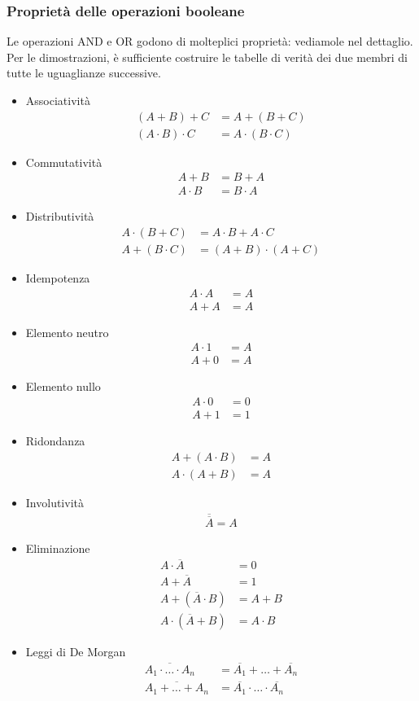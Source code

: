 \documentclass[a4paper, 11pt]{article}
\renewcommand{\sf}{\textsf}
\begin{document}
\subsubsection{Proprietà delle operazioni booleane}
Le operazioni \sf{AND} e \sf{OR} godono di molteplici proprietà: vediamole nel dettaglio. Per le dimostrazioni, è sufficiente costruire le tabelle di verità dei due membri di tutte le uguaglianze successive.
\begin{itemize}
	\item Associatività
	\begin{align*}
		(A+B)+C&=A+(B+C)\\
		(A\cdot B)\cdot C&=A\cdot(B\cdot C)
	\end{align*}
	\item Commutatività
	\begin{align*}
		A+B&=B+A\\A\cdot B&=B\cdot A
	\end{align*}
	\item Distributività
	\begin{align*}
		A\cdot(B+C)&=A\cdot B+A\cdot C\\
		A+(B\cdot C)&=(A+B)\cdot(A+C)
	\end{align*}
	\item Idempotenza
	\begin{align*}
		A\cdot A&=A\\A+A&=A
	\end{align*}
	\item Elemento neutro
	\begin{align*}
		A\cdot 1&=A\\A+0&=A
	\end{align*}
	\item Elemento nullo
	\begin{align*}
		A\cdot0&=0\\A+1&=1
	\end{align*}
	\item Ridondanza
	\begin{align*}
		A+(A\cdot B)&=A\\A\cdot(A+B)&=A
	\end{align*}
	\item Involutività
	\begin{align*}
		\overline{\overline{A}}=A
	\end{align*}
	\item Eliminazione
	\begin{align*}
		A\cdot\overline{A}&=0\\A+\overline{A}&=1\\
		A+(\overline{A}\cdot B)&=A+B\\A\cdot(\overline{A}+B)&=A\cdot B
	\end{align*}
	\item Leggi di De Morgan
	\begin{align*}
		\overline{A_1\cdot \ldots\cdot A_n}&=\overline{A_1}+\ldots+\overline{A_n}\\\overline{A_1+\ldots+A_n}&=\overline{A_1}\cdot\ldots\cdot\overline{A_n}
	\end{align*}
\end{itemize}
\end{document}
